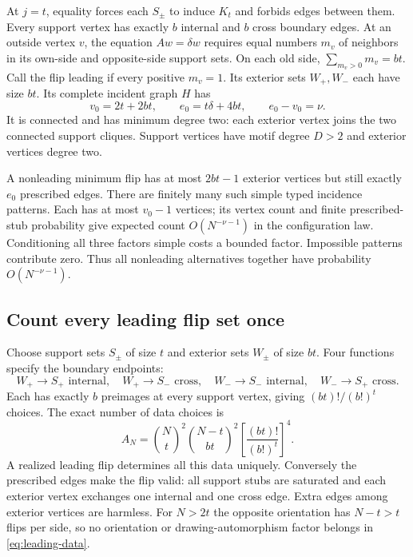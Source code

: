 At $j=t$, equality forces each $S_\pm$ to induce $K_t$ and forbids
edges between them. Every support vertex has exactly $b$ internal and
$b$ cross boundary edges. At an outside vertex $v$, the equation
$Aw=\delta w$ requires equal numbers $m_v$ of neighbors in its own-side
and opposite-side support sets. On each old side,
$\sum_{m_v>0}m_v=bt$. Call the flip leading if every positive $m_v=1$.
Its exterior sets $W_+,W_-$ each have size $bt$. Its complete incident
graph $H$ has
\begin{equation}\label{eq:motif-excess}
 v_0=2t+2bt,\qquad e_0=t\delta+4bt,\qquad e_0-v_0=\nu.
\end{equation}
It is connected and has minimum degree two: each exterior vertex joins
the two connected support cliques. Support vertices have motif degree
$D>2$ and exterior vertices degree two.

A nonleading minimum flip has at most $2bt-1$ exterior vertices but still
exactly $e_0$ prescribed edges. There are finitely many such simple typed
incidence patterns. Each has at most $v_0-1$ vertices; its vertex count
and finite prescribed-stub probability give expected count
$O(N^{-\nu-1})$ in the configuration law. Conditioning all three factors
simple costs a bounded factor. Impossible patterns contribute zero.
Thus all nonleading alternatives together have probability
$O(N^{-\nu-1})$.

\subsection{Count every leading flip set once}
Choose support sets $S_\pm$ of size $t$ and exterior sets $W_\pm$ of
size $bt$. Four functions specify the boundary endpoints:
\[
 W_+\to S_+\text{ internal},\quad W_+\to S_-\text{ cross},\quad
 W_-\to S_-\text{ internal},\quad W_-\to S_+\text{ cross}.
\]
Each has exactly $b$ preimages at every support vertex, giving
$(bt)!/(b!)^t$ choices. The exact number of data choices is
\begin{equation}\label{eq:leading-data}
 A_N=\binom Nt^2\binom{N-t}{bt}^2
       \left[\frac{(bt)!}{(b!)^t}\right]^4.
\end{equation}
A realized leading flip determines all this data uniquely. Conversely
the prescribed edges make the flip valid: all support stubs are saturated
and each exterior vertex exchanges one internal and one cross edge.
Extra edges among exterior vertices are harmless. For $N>2t$ the
opposite orientation has $N-t>t$ flips per side, so no orientation or
drawing-automorphism factor belongs in \eqref{eq:leading-data}.

